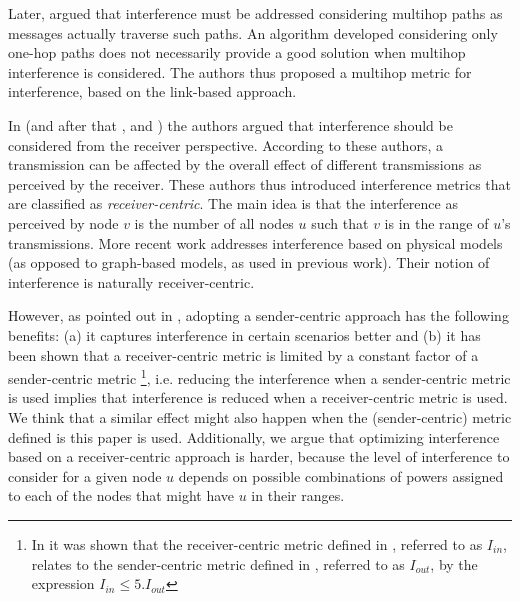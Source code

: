 \documentclass{llncs}
\begin{document}
Later, \cite{blough2005} argued that interference must be addressed considering multihop paths as messages
actually traverse such paths. An algorithm developed considering only one-hop paths does not necessarily
provide a good solution when multihop interference is considered. The authors thus proposed 
a multihop metric for interference, based on the link-based approach. 

In \cite{fussen2005} (and after that \cite{johansson2005}, \cite{moscibroda2005} and \cite{rickenbach2005}) the authors argued that interference
should be considered from the receiver perspective. According to these authors, a transmission can be affected
by the overall effect of different transmissions as perceived by the receiver. These authors thus introduced interference
metrics that are classified as \emph{receiver-centric}. The main idea is that the interference as perceived by
node $v$ is the number of all nodes $u$ such that $v$ is in the range of $u$'s transmissions. More recent work 
\cite{liu2008,Gao2008} addresses interference based on physical models (as opposed to graph-based
models, as used in previous work). Their notion of interference is naturally receiver-centric. 


However, as pointed out in \cite{damian2008}, adopting a sender-centric approach has the following benefits:
(a) it captures interference in certain scenarios better
and (b) it has been shown that a receiver-centric metric is limited by a constant factor of a sender-centric metric \cite{Burkhart03}\footnote{In \cite{Burkhart03} it was shown that the 
receiver-centric metric defined in \cite{rickenbach2005}, referred to as $I_{in}$, relates to the sender-centric metric defined in \cite{burkhart2004},
referred to as $I_{out}$, by the expression $I_{in} \le 5 . I_{out}$}, i.e. 
reducing the interference when a sender-centric metric is used implies that interference is reduced when a receiver-centric metric is used.
We think that a similar effect might also happen when the (sender-centric) metric defined is this paper is used.
Additionally, we argue that optimizing interference based on a receiver-centric approach is harder, because the level of interference to consider for a given
node $u$ depends on possible combinations of powers assigned to each of the nodes that might have $u$ in their ranges.
\end{document}
